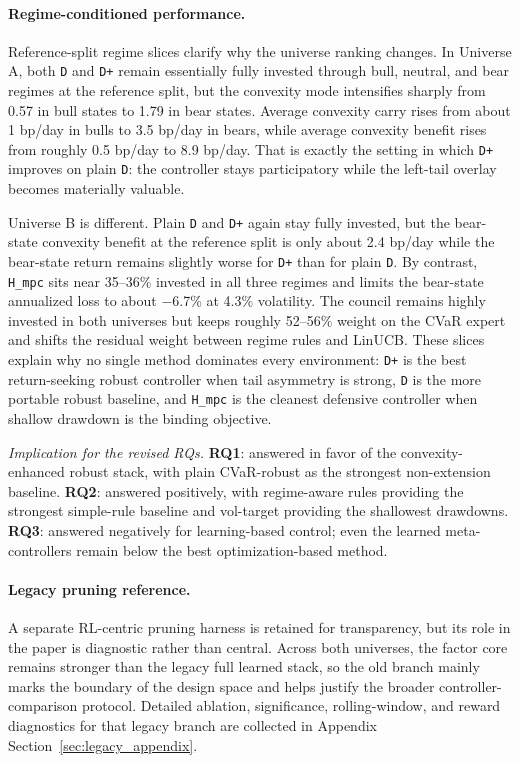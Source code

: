 \documentclass[10pt,twocolumn]{article}
\begin{document}
\paragraph{Regime-conditioned performance.}
Reference-split regime slices clarify why the universe ranking changes. In
Universe A, both \texttt{D} and \texttt{D+} remain essentially fully invested
through bull, neutral, and bear regimes at the reference split, but the
convexity mode intensifies sharply from 0.57 in bull states to 1.79 in bear
states. Average convexity carry rises from about 1 bp/day in bulls to 3.5
bp/day in bears, while average convexity benefit rises from roughly 0.5 bp/day
to 8.9 bp/day. That is exactly the setting in which \texttt{D+} improves on
plain \texttt{D}: the controller stays participatory while the left-tail
overlay becomes materially valuable.

Universe B is different. Plain \texttt{D} and \texttt{D+} again stay fully
invested, but the bear-state convexity benefit at the reference split is only
about 2.4 bp/day while the bear-state return remains slightly worse for
\texttt{D+} than for plain \texttt{D}. By contrast, \texttt{H\_mpc} sits near
35--36\% invested in all three regimes and limits the bear-state annualized
loss to about $-$6.7\% at 4.3\% volatility. The council remains highly invested
in both universes but keeps roughly 52--56\% weight on the CVaR expert and
shifts the residual weight between regime rules and LinUCB. These slices
explain why no single method dominates every environment: \texttt{D+} is the
best return-seeking robust controller when tail asymmetry is strong,
\texttt{D} is the more portable robust baseline, and \texttt{H\_mpc} is the
cleanest defensive controller when shallow drawdown is the binding objective.

\noindent\textit{Implication for the revised RQs.} \textbf{RQ1}: answered in
favor of the convexity-enhanced robust stack, with plain CVaR-robust as the
strongest non-extension baseline. \textbf{RQ2}: answered positively, with
regime-aware rules providing the strongest simple-rule baseline and vol-target
providing the shallowest drawdowns. \textbf{RQ3}: answered negatively for
learning-based control; even the learned meta-controllers remain below the best
optimization-based method.

\paragraph{Legacy pruning reference.}
A separate RL-centric pruning harness is retained for transparency, but its
role in the paper is diagnostic rather than central. Across both universes, the
factor core remains stronger than the legacy full learned stack, so the old
branch mainly marks the boundary of the design space and helps justify the
broader controller-comparison protocol. Detailed ablation, significance,
rolling-window, and reward diagnostics for that legacy branch are collected in
Appendix Section~\ref{sec:legacy_appendix}.
\end{document}
